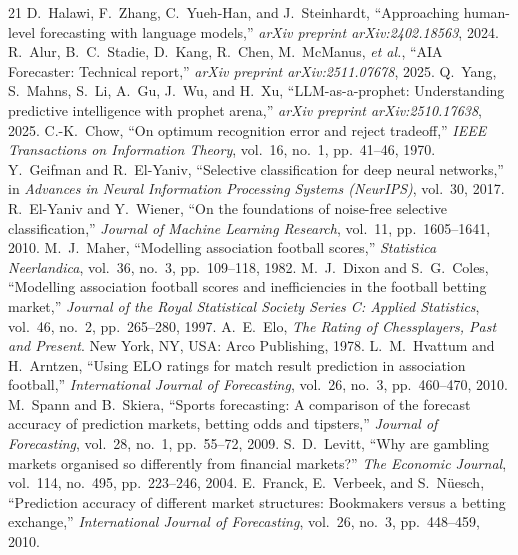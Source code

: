 \documentclass[10pt]{article}
\begin{document}
\begin{thebibliography}{21}
 D.~Halawi, F.~Zhang, C.~Yueh-Han, and J.~Steinhardt,
``Approaching human-level forecasting with language models,'' \emph{arXiv
preprint arXiv:2402.18563}, 2024.
 R.~Alur, B.~C.~Stadie, D.~Kang, R.~Chen, M.~McManus,
\emph{et al.}, ``AIA Forecaster: Technical report,'' \emph{arXiv preprint
arXiv:2511.07678}, 2025.
 Q.~Yang, S.~Mahns, S.~Li, A.~Gu, J.~Wu, and H.~Xu,
``LLM-as-a-prophet: Understanding predictive intelligence with prophet arena,''
\emph{arXiv preprint arXiv:2510.17638}, 2025.
 C.-K.~Chow, ``On optimum recognition error and reject
tradeoff,'' \emph{IEEE Transactions on Information Theory}, vol.~16, no.~1,
pp.~41--46, 1970.
 Y.~Geifman and R.~El-Yaniv, ``Selective classification
for deep neural networks,'' in \emph{Advances in Neural Information Processing
Systems (NeurIPS)}, vol.~30, 2017.
 R.~El-Yaniv and Y.~Wiener, ``On the foundations of
noise-free selective classification,'' \emph{Journal of Machine Learning
Research}, vol.~11, pp.~1605--1641, 2010.
 M.~J.~Maher, ``Modelling association football scores,''
\emph{Statistica Neerlandica}, vol.~36, no.~3, pp.~109--118, 1982.
 M.~J.~Dixon and S.~G.~Coles, ``Modelling association
football scores and inefficiencies in the football betting market,''
\emph{Journal of the Royal Statistical Society Series C: Applied Statistics},
vol.~46, no.~2, pp.~265--280, 1997.
 A.~E.~Elo, \emph{The Rating of Chessplayers, Past and
Present}. New York, NY, USA: Arco Publishing, 1978.
 L.~M.~Hvattum and H.~Arntzen, ``Using ELO ratings for
match result prediction in association football,'' \emph{International Journal
of Forecasting}, vol.~26, no.~3, pp.~460--470, 2010.
 M.~Spann and B.~Skiera, ``Sports forecasting: A comparison
of the forecast accuracy of prediction markets, betting odds and tipsters,''
\emph{Journal of Forecasting}, vol.~28, no.~1, pp.~55--72, 2009.
 S.~D.~Levitt, ``Why are gambling markets organised so
differently from financial markets?'' \emph{The Economic Journal}, vol.~114,
no.~495, pp.~223--246, 2004.
 E.~Franck, E.~Verbeek, and S.~N\"uesch, ``Prediction
accuracy of different market structures: Bookmakers versus a betting
exchange,'' \emph{International Journal of Forecasting}, vol.~26, no.~3,
pp.~448--459, 2010.

\end{thebibliography}
\end{document}
